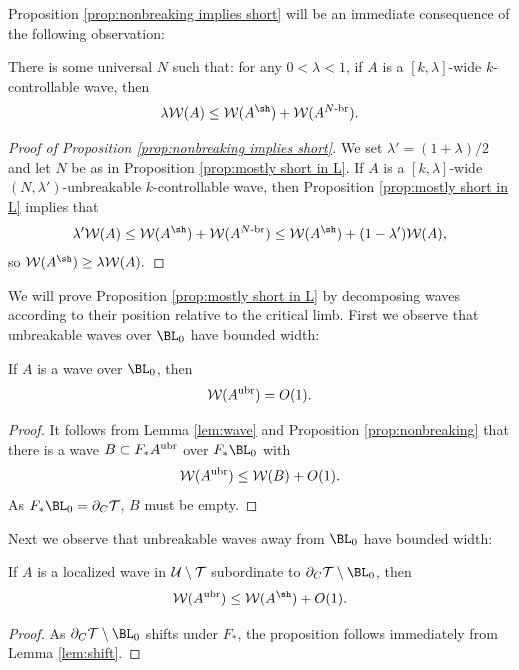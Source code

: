 \documentclass[12pt]{amsart}
\begin{document}
Proposition \ref{prop:nonbreaking implies short} will be an immediate consequence of the following observation:

\begin{prop}\label{prop:mostly short in L}
	There is some universal $N$ such that: for any $0<\lambda< 1$, if $A$ is a $[k, \lambda]$-wide $k$-controllable wave, then $$\lambda\WW(A)\leq \WW(A^\sh)+\WW(A^{N\mathhyphen\br}).$$
\end{prop}

\begin{proof}[Proof of Proposition \ref{prop:nonbreaking implies short}]
	We set $\lambda' = (1+\lambda)/2$ and let $N$ be as in Proposition \ref{prop:mostly short in L}.
	If $A$ is a $[k, \lambda]$-wide $(N, \lambda')$-unbreakable $k$-controllable wave, then  Proposition \ref{prop:mostly short in L} implies that
	\begin{align*}
		\lambda'\WW(A)\leq \WW(A^\sh)+ \WW(A^{N\mathhyphen\br})\leq \WW(A^\sh)+ (1-\lambda')\WW(A),
	\end{align*}
	so $\WW(A^\sh)\geq \lambda\WW(A).$
\end{proof}

We will prove Proposition \ref{prop:mostly short in L} by decomposing waves according to their position relative to the critical limb.
First we observe that unbreakable  waves over $\BL_0$  have bounded width:
\begin{prop}\label{prop:over critical}
	If $A$ is a wave over $\BL_0$, then 
	$$\mathcal W(A^{{\mathrm{ubr}}})= O(1).$$
\end{prop}
\begin{proof}
	It follows from Lemma \ref{lem:wave} and Proposition \ref{prop:nonbreaking} that there is a wave $B\subset F_* A^{{\mathrm{ubr}}}$ over $F_*\BL_0$ with $$\mathcal W(A^{{\mathrm{ubr}}})\leq \mathcal W(B)+O(1).$$
	As $F_*\BL_0= \dcara \TT$, $B$ must be empty.
\end{proof}

Next we observe that unbreakable waves away from $\BL_0$ have bounded width:
\begin{prop}\label{prop:away from critical}
	If $A$ is a localized wave in $\mathcal U\setminus \mathcal T$ subordinate to $\dcara\TT\sm \BL_0$, then 
	\begin{equation*}
		\WW(A^\nbr)\leq \WW(A^\sh)+ O(1).
	\end{equation*}
\end{prop}
\begin{proof}
	As $\dcara \TT \sm \BL_0$ shifts under $F_*$, the proposition follows immediately from Lemma \ref{lem:shift}.
\end{proof}
\end{document}
